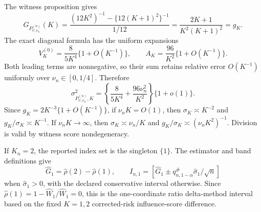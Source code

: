 The witness proposition gives
\[
 G_{P_{U,\nu_n}^{(n)}}(K)
 =\frac{(12K^2)^{-1}-\{12(K+1)^2\}^{-1}}{1/12}
 =\frac{2K+1}{K^2(K+1)^2}=g_K.
\]
The exact diagonal formula has the uniform expansions
\[
 V_K^{(0)}=\frac8{5K^4}\{1+O(K^{-1})\},\qquad
 A_K=\frac{96}{K^2}\{1+O(K^{-1})\}.
\]
Both leading terms are nonnegative, so their sum retains relative error \(O(K^{-1})\) uniformly over \(\nu_n\in[0,1/4]\).  Therefore
\[
 \sigma_{P_{U,\nu_n}^{(n)},K}^2
 =\left\{\frac8{5K^4}+\frac{96\nu_n^2}{K^2}\right\}\{1+o(1)\}.
\]
Since \(g_K=2K^{-3}\{1+O(K^{-1})\}\), if \(\nu_nK=O(1)\), then \(\sigma_K\asymp K^{-2}\) and \(g_K/\sigma_K\asymp K^{-1}\).  If \(\nu_nK\to\infty\), then \(\sigma_K\asymp\nu_n/K\) and \(g_K/\sigma_K\asymp(\nu_nK^2)^{-1}\).  Division is valid by witness score nondegeneracy.

If \(K_n=2\), the reported index set is the singleton \(\{1\}\).  The estimator and band definitions give
\[
 \widehat G_1=\widehat\rho(2)-\widehat\rho(1),\qquad
 I_{n,1}=[\widehat G_1\pm q_{n,1-\alpha}^{\#}\widehat\sigma_1/\sqrt n]
\]
when \(\widehat\sigma_1>0\), with the declared conservative interval otherwise.  Since \(\widehat\rho(1)=1-\widehat W_1/\widehat W_1=0\), this is the one-coordinate ratio delta-method interval based on the fixed \(K=1,2\) corrected-risk influence-score difference.